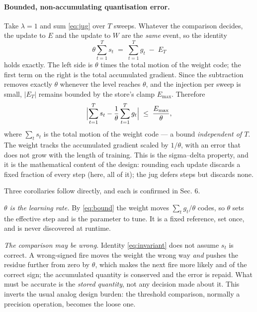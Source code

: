 \documentclass[11pt]{article}
\begin{document}
\hypertarget{bounded-non-accumulating-quantisation-error.}{%
\paragraph{Bounded, non-accumulating quantisation
error.}\label{bounded-non-accumulating-quantisation-error.}}

Take \(\lambda = 1\) and sum \eqref{eq:jug} over \(T\) sweeps. Whatever the
comparison decides, the update to \(E\) and the update to \(W\) are the
\emph{same} event, so the identity
\begin{equation}
\theta \sum_{t=1}^{T} s_t \;=\; \sum_{t=1}^{T} g_t \;-\; E_T
\label{eq:invariant}
\end{equation} holds exactly. The left side is \(\theta\) times
the total motion of the weight code; the first term on the right is the
total accumulated gradient. Since the subtraction removes exactly
\(\theta\) whenever the level reaches \(\theta\), and the injection per
sweep is small, \(|E_T|\) remains bounded by the store's clamp
\(E_{\max}\). Therefore
\begin{equation}
\Bigl| \sum_{t=1}^{T} s_t - \frac{1}{\theta}\sum_{t=1}^{T} g_t \Bigr|
\;\le\; \frac{E_{\max}}{\theta},
\label{eq:bound}
\end{equation} where \(\sum_t s_t\) is the total motion of the
weight code --- a bound \emph{independent of \(T\)}. The weight tracks
the accumulated gradient scaled by \(1/\theta\), with an error that does
not grow with the length of training. This is the sigma--delta property,
and it is the mathematical content of the design: rounding each update
discards a fixed fraction of every step (here, all of it); the jug
defers steps but discards none.

Three corollaries follow directly, and each is confirmed in Sec. 6.

\emph{\(\theta\) is the learning rate.} By \eqref{eq:bound} the weight moves
\(\sum_t g_t/\theta\) codes, so \(\theta\) sets the effective step and
is the parameter to tune. It is a fixed reference, set once, and is
never discovered at runtime.

\emph{The comparison may be wrong.} Identity \eqref{eq:invariant} does not assume \(s_t\)
is correct. A wrong-signed fire moves the weight the wrong way
\emph{and} pushes the residue further from zero by \(\theta\), which
makes the next fire more likely and of the correct sign; the accumulated
quantity is conserved and the error is repaid. What must be accurate is
the \emph{stored quantity}, not any decision made about it. This inverts
the usual analog design burden: the threshold comparison, normally a
precision operation, becomes the loose one.
\end{document}
